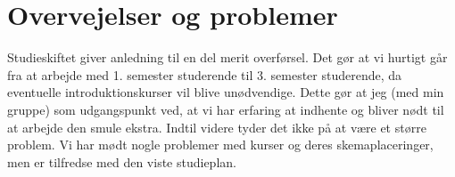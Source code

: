 \section{Overvejelser og problemer}

Studieskiftet giver anledning til en del merit overførsel. Det gør at vi hurtigt går fra at arbejde med 1. semester studerende til 3. semester studerende, da eventuelle introduktionskurser vil blive unødvendige. Dette gør at jeg (med min gruppe) som udgangspunkt ved, at vi har erfaring at indhente og bliver nødt til at arbejde den smule ekstra. Indtil videre tyder det ikke på at være et større problem. Vi har mødt nogle problemer med kurser og deres skemaplaceringer, men er tilfredse med den viste studieplan.


